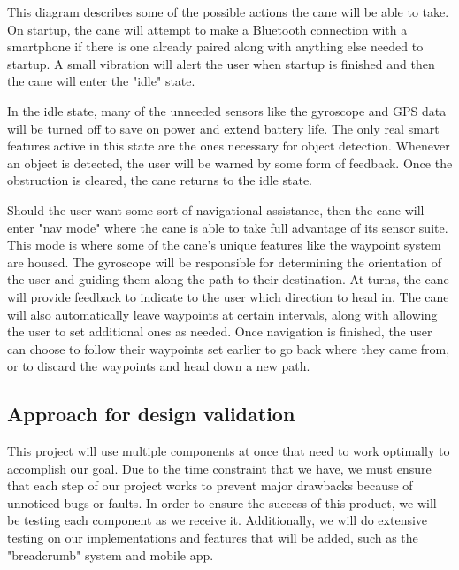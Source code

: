 \documentclass[letterpaper,12pt]{article}
\begin{document}

\medskip

This diagram describes some of the possible actions the cane will be able to take. On startup, the cane will attempt to make a Bluetooth connection with a smartphone if there is one already paired along with anything else needed to startup. A small vibration will alert the user when startup is finished and then the cane will enter the "idle" state. \par

In the idle state, many of the unneeded sensors like the gyroscope and GPS data will be turned off to save on power and extend battery life. The only real smart features active in this state are the ones necessary for object detection. Whenever an object is detected, the user will be warned by some form of feedback. Once the obstruction is cleared, the cane returns to the idle state. \par 

Should the user want some sort of navigational assistance, then the cane will enter "nav mode" where the cane is able to take full advantage of its sensor suite. This mode is where some of the cane's unique features like the waypoint system are housed. The gyroscope will be responsible for determining the orientation of the user and guiding them along the path to their destination. At turns, the cane will provide feedback to indicate to the user which direction to head in. The cane will also automatically leave waypoints at certain intervals, along with allowing the user to set additional ones as needed. Once navigation is finished, the user can choose to follow their waypoints set earlier to go back where they came from, or to discard the waypoints and head down a new path. \par

\subsection{Approach for design validation}
This project will use multiple components at once that need to work optimally to accomplish our goal. Due to the time constraint that we have, we must ensure that each step of our project works to prevent major drawbacks because of unnoticed bugs or faults. In order to ensure the success of this product, we will be testing each component as we receive it. Additionally, we will do extensive testing on our implementations and features that will be added, such as the "breadcrumb" system and mobile app. \par
\end{document}
